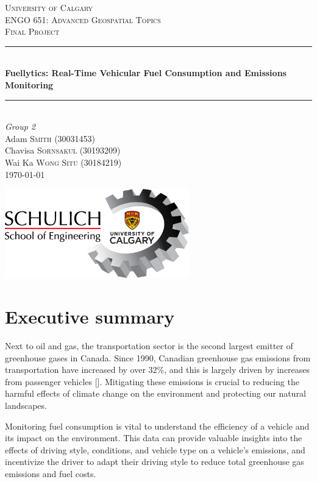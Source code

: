 \documentclass[11pt, oneside]{article}
\newcounter{refno}
\newcommand{\reflabel}[1]{\refstepcounter{refno}\label{#1}[\arabic{refno}]}  %
\begin{document}
\begin{titlepage}
	\newcommand{\HRule}{\rule{\linewidth}{0.5mm}}
	
	\center
	\textsc{\LARGE University of Calgary}\\[1.5cm]
	\textsc{\Large ENGO 651: Advanced Geospatial Topics}\\[0.5cm]
	\textsc{\large Final Project}\\[0.5cm]

	\HRule\\[0.4cm]
	{\huge\bfseries Fuellytics: Real-Time Vehicular Fuel Consumption and Emissions Monitoring}\\[0.4cm]
	\HRule\\[1.5cm]
	
	{\large\textit{Group 2}}\\
	Adam \textsc{Smith} (30031453)\\
	Chavisa \textsc{Sornsakul} (30193209)\\
	Wai Ka \textsc{Wong Situ} (30184219)\\
	
	\vfill\vfill\vfill
	{\large \today}
	
	\vfill\vfill\vfill
	\includegraphics[width=8cm,]{img/schulich.png}\\[1cm]	
\end{titlepage}

\section{Executive summary}
Next to oil and gas, the transportation sector is the second largest emitter of greenhouse gases in Canada.  Since 1990, Canadian greenhouse gas emissions from transportation have increased by over 32\%, and this is largely driven by increases from passenger vehicles \reflabel{canadaghg}.  Mitigating these emissions is crucial to reducing the harmful effects of climate change on the environment and protecting our natural landscapes.

Monitoring fuel consumption is vital to understand the efficiency of a vehicle and its impact on the environment.  This data can provide valuable insights into the effects of driving style, conditions, and vehicle type on a vehicle's emissions, and incentivize the driver to adapt their driving style to reduce total greenhouse gas emissions and fuel costs.  
\end{document}
